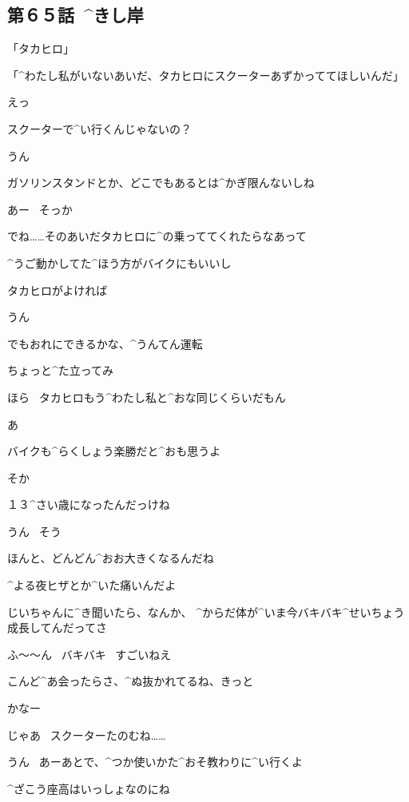 \subsection{第６５話\ ^{きし}{岸}}

\page[146]
\Alpha 「タカヒロ」

\page[147]
\Alpha 「^{わたし}{私}がいないあいだ、タカヒロにスクーターあずかっててほしいんだ」

\page[148]
\Takahiro えっ

\Takahiro スクーターで^{い}{行}くんじゃないの？

\Alpha うん

\Alpha ガソリンスタンドとか、どこでもあるとは^{かぎ}{限}んないしね

\Takahiro あー
\ そっか

\page[149]
\Alpha でね……そのあいだタカヒロに^{の}{乗}っててくれたらなあって

\Alpha ^{うご}{動}かしてた^{ほう}{方}がバイクにもいいし

\Alpha タカヒロがよければ

\Takahiro うん

\Takahiro でもおれにできるかな、^{うんてん}{運転}

\Alpha ちょっと^{た}{立}ってみ

\page[150]
\Alpha ほら
\ タカヒロもう^{わたし}{私}と^{おな}{同}じくらいだもん

\Takahiro あ

\Alpha バイクも^{らくしょう}{楽勝}だと^{おも}{思}うよ

\Takahiro そか

\page[151]
\Alpha １３^{さい}{歳}になったんだっけね

\Takahiro うん
\ そう

\Alpha ほんと、どんどん^{おお}{大}きくなるんだね

\Takahiro ^{よる}{夜}ヒザとか^{いた}{痛}いんだよ

\Takahiro じいちゃんに^{き}{聞}いたら、なんか、
^{からだ}{体}が^{いま}{今}バキバキ^{せいちょう}{成長}してんだってさ

\page[152]
\Alpha ふ〜〜ん
\ バキバキ
\ すごいねえ

\Alpha こんど^{あ}{会}ったらさ、^{ぬ}{抜}かれてるね、きっと

\Takahiro かなー

\Alpha じゃあ
\ スクーターたのむね……

\Takahiro うん
\ あーあとで、^{つか}{使}いかた^{おそ}{教}わりに^{い}{行}くよ

\page[153]
\Alpha ^{ざこう}{座高}はいっしょなのにね

